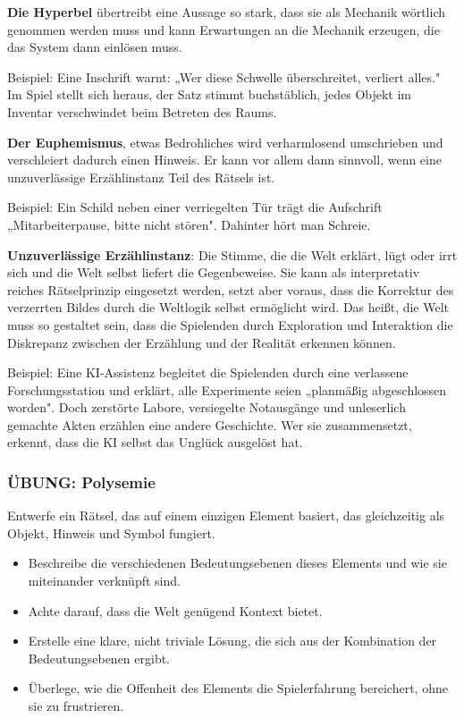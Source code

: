 \documentclass[parskip=half,a4paper,11pt]{scrreprt}
\begin{document}
\textbf{Die Hyperbel} übertreibt eine Aussage so stark, dass sie als Mechanik wörtlich genommen werden muss und kann Erwartungen an die Mechanik erzeugen, die das System dann einlösen muss.

Beispiel: Eine Inschrift warnt: „Wer diese Schwelle überschreitet, verliert alles." Im Spiel stellt sich heraus, der Satz stimmt buchstäblich, jedes Objekt im Inventar verschwindet beim Betreten des Raums.

\textbf{Der Euphemismus}, etwas Bedrohliches wird verharmlosend umschrieben und verschleiert dadurch einen Hinweis. Er kann vor allem dann sinnvoll, wenn eine unzuverlässige Erzählinstanz Teil des Rätsels ist.

Beispiel: Ein Schild neben einer verriegelten Tür trägt die Aufschrift „Mitarbeiterpause, bitte nicht stören". Dahinter hört man Schreie.

\textbf{Unzuverlässige Erzählinstanz}: Die Stimme, die die Welt erklärt, lügt oder irrt sich und die Welt selbst liefert die Gegenbeweise. Sie kann als interpretativ reiches Rätselprinzip eingesetzt werden, setzt aber voraus, dass die Korrektur des verzerrten Bildes durch die Weltlogik selbst ermöglicht wird. Das heißt, die Welt muss so gestaltet sein, dass die Spielenden durch Exploration und Interaktion die Diskrepanz zwischen der Erzählung und der Realität erkennen können. 

Beispiel: Eine KI-Assistenz begleitet die Spielenden durch eine verlassene Forschungsstation und erklärt, alle Experimente seien „planmäßig abgeschlossen worden". Doch zerstörte Labore, versiegelte Notausgänge und unleserlich gemachte Akten erzählen eine andere Geschichte. Wer sie zusammensetzt, erkennt, dass die KI selbst das Unglück ausgelöst hat.

\subsubsection{ÜBUNG: Polysemie}

Entwerfe ein Rätsel, das auf einem einzigen Element basiert, das gleichzeitig als Objekt, Hinweis und Symbol fungiert. 
\begin{itemize}
    \item Beschreibe die verschiedenen Bedeutungsebenen dieses Elements und wie sie miteinander verknüpft sind. 
    \item Achte darauf, dass die Welt genügend Kontext bietet.
    \item Erstelle eine klare,  nicht triviale Lösung, die sich aus der Kombination der Bedeutungsebenen ergibt.
    \item Überlege, wie die Offenheit des Elements die Spielerfahrung bereichert, ohne sie zu frustrieren.
\end{itemize}
\end{document}
